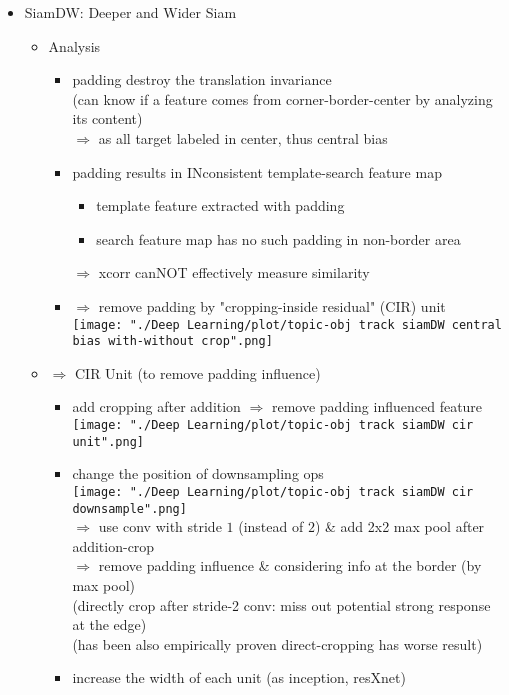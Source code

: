 \begin{itemize}
\item SiamDW: Deeper and Wider Siam
	\begin{itemize}
	\item Analysis
		\begin{itemize}
		\item padding destroy the translation invariance \\
		(can know if a feature comes from corner-border-center by analyzing its content) \\
		$\Rightarrow$ as all target labeled in center, thus central bias
		\item padding results in INconsistent template-search feature map
			\begin{itemize}
			\item template feature extracted with padding
			\item search feature map has no such padding in non-border area
			\end{itemize}
		$\Rightarrow$ xcorr canNOT effectively measure similarity
		\item $\Rightarrow$ remove padding by "cropping-inside residual" (CIR) unit \\
		\texttt{[image: "./Deep Learning/plot/topic-obj track siamDW central bias with-without crop".png]}		
		\end{itemize}
	\item $\Rightarrow$ CIR Unit (to remove padding influence)
		\begin{itemize}
		\item add cropping after addition $\Rightarrow$ remove padding influenced feature \\
		\texttt{[image: "./Deep Learning/plot/topic-obj track siamDW cir unit".png]}
		\item change the position of downsampling ops \\
		\texttt{[image: "./Deep Learning/plot/topic-obj track siamDW cir downsample".png]} \\
		$\Rightarrow$ use conv with stride $1$ (instead of $2$) \& add 2x2 max pool after addition-crop \\
		$\Rightarrow$ remove padding influence \& considering info at the border (by max pool) \\
		(directly crop after stride-2 conv: miss out potential strong response at the edge) \\
		(has been also empirically proven direct-cropping has worse result)
		\item increase the width of each unit (as inception, resXnet) \\

\end{itemize}
\end{itemize}
\end{itemize}
